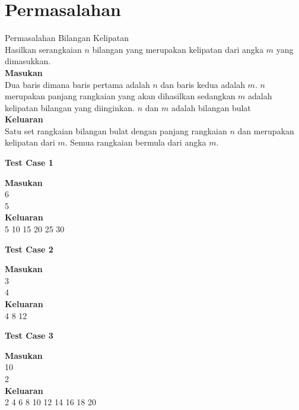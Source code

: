 \newpage
\section{Permasalahan}
\begin{permasalahan}{Permasalahan Bilangan Kelipatan}\\
\label{prob:bilanganKelipatan}
	Hasilkan serangkaian $n$ bilangan yang merupakan kelipatan dari angka $m$ yang dimasukkan.\\
	\textbf{Masukan}\\
	Dua baris dimana baris pertama adalah $n$ dan baris kedua adalah $m$. $n$ merupakan panjang rangkaian yang akan dihasilkan sedangkan $m$ adalah kelipatan bilangan yang diinginkan. $n$ dan $m$ adalah bilangan bulat\\
	\textbf{Keluaran}\\
	Satu set rangkaian bilangan bulat dengan panjang rangkaian $n$ dan merupakan kelipatan dari $m$. Semua rangkaian bermula dari angka $m$.\\
	\begin{center}
	\textbf{Test Case 1}\\
	\end{center}
	\textbf{Masukan}\\
	6\\
	5\\
	\textbf{Keluaran}\\
	5 10 15 20 25 30 \\
	\begin{center}
	\textbf{Test Case 2}\\
	\end{center}
	\textbf{Masukan}\\
	3\\
	4\\
	\textbf{Keluaran}\\
	4 8 12 \\
	\begin{center}
	\textbf{Test Case 3}\\
	\end{center}
	\textbf{Masukan}\\
	10\\
	2\\
	\textbf{Keluaran}\\
	2 4 6 8 10 12 14 16 18 20\\
\end{permasalahan}

